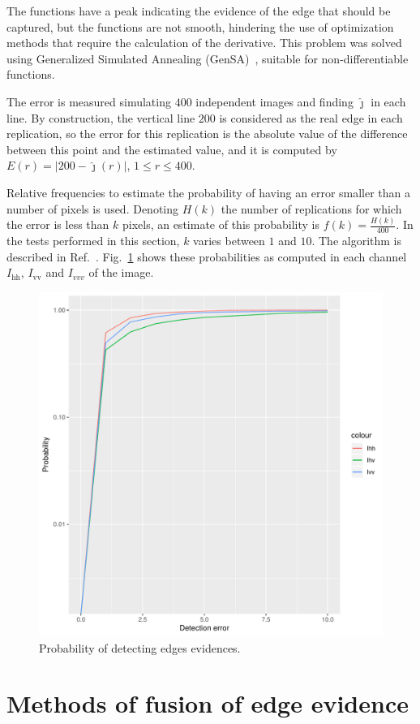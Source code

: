 \documentclass[conference]{IEEEtran}
\begin{document}
The functions have a peak indicating the evidence of the edge that should be captured, but the functions are not smooth, hindering the use of optimization methods that require the calculation of the derivative.
This problem was solved using Generalized Simulated Annealing (GenSA)~\cite{xgsh}, suitable for non-differentiable functions.
    
The error is measured simulating $400$ independent images and finding $\widehat\jmath$ in each line.
By construction, the vertical line $200$ is considered as the real edge in each replication, so the error for this replication is the absolute value of the difference between this point and the estimated value, and it is computed by $E(r) = |200 - \widehat{\jmath}(r)|$, $1\leq r \leq 400$.

Relative frequencies to estimate the probability of having an error smaller than a number of pixels is used. 
Denoting $H(k)$ the number of replications for which the error is less than $k$ pixels, an estimate of this probability is $f(k)=\frac{H(k)}{400}$. 
In the tests performed in this section, $k$ varies between $1$ and $10$. 
The algorithm is described in Ref.~\cite{fbgm}.
Fig.~\ref{probability_edge_detc} shows these probabilities as computed in each channel $I_\text{hh}$, $I_\text{vv}$ and $I_{vvv}$ of the image. 
  
\begin{figure}[hbt]
	\centering
	\includegraphics[width=.7\linewidth]{metricas_ihh_ivh_ivv_nhfc_artigos}%
	\caption{Probability of detecting edges evidences.}
\label{probability_edge_detc}
\end{figure}

\section{Methods of fusion of edge evidence}\label{sec_07}
\end{document}
